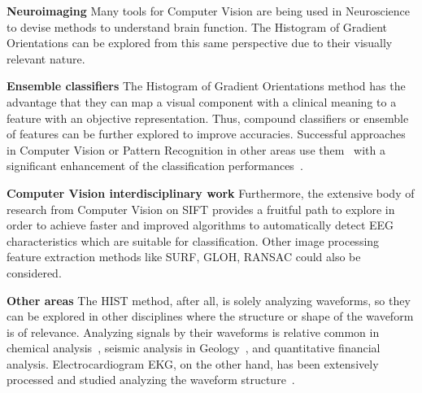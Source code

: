 \textbf{Neuroimaging}
Many tools for Computer Vision are being used in Neuroscience to devise methods to understand brain function.  The Histogram of Gradient Orientations can be explored from this same perspective due to their visually relevant nature.

\textbf{Ensemble classifiers}
The Histogram of Gradient Orientations method has the advantage that they can map a visual component with a clinical meaning to a feature with an objective representation. Thus, compound classifiers or ensemble of features can be further explored to improve accuracies.  Successful approaches in Computer Vision or Pattern Recognition in other areas use them~\cite{Criminisi2013} with a significant enhancement of the classification performances~\cite{Gu2012}.

\textbf{Computer Vision interdisciplinary work}
Furthermore, the extensive body of research from Computer Vision on SIFT provides a fruitful path to explore in order to achieve faster and improved algorithms to automatically detect EEG characteristics which are suitable for classification. Other image processing feature extraction methods like SURF, GLOH, RANSAC could also be considered.

\textbf{Other areas}
The HIST method, after all, is solely analyzing waveforms, so they can be explored in other disciplines where the structure or shape of the waveform is of relevance.  Analyzing signals by their waveforms is relative common in chemical analysis~\cite{Skoog2000}, seismic analysis in Geology~\cite{Owens1984}, and quantitative financial analysis.  Electrocardiogram EKG, on the other hand, has been extensively processed and studied analyzing the waveform structure~\cite{Stockman1976}.



%
